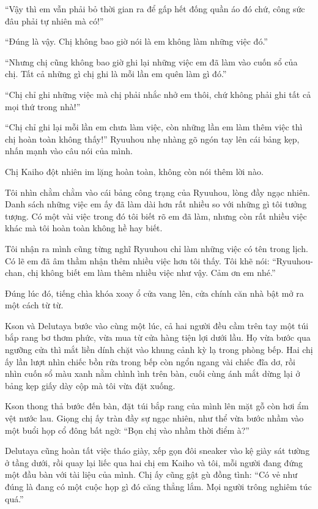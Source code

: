 \documentclass[../main.tex]{subfiles}
\begin{document}
``Vậy thì em vẫn phải bỏ thời gian ra để gấp hết đống quần áo đó chứ, công sức đâu phải tự nhiên mà có!''

``Đúng là vậy. Chị không bao giờ nói là em không làm những việc đó.''

``Nhưng chị cũng không bao giờ ghi lại những việc em đã làm vào cuốn sổ của chị. Tất cả những gì chị ghi là mỗi lần em quên làm gì đó.''

``Chị chỉ ghi những việc mà chị phải nhắc nhở em thôi, chứ không phải ghi tất cả mọi thứ trong nhà!''

``Chị chỉ ghi lại mỗi lần em chưa làm việc, còn những lần em làm thêm việc thì chị hoàn toàn không thấy!'' Ryuuhou nhẹ nhàng gõ ngón tay lên cái bảng kẹp, nhấn mạnh vào câu nói của mình.

Chị Kaiho đột nhiên im lặng hoàn toàn, không còn nói thêm lời nào.

Tôi nhìn chằm chằm vào cái bảng công trạng của Ryuuhou, lòng đầy ngạc nhiên. Danh sách những việc em ấy đã làm dài hơn rất nhiều so với những gì tôi tưởng tượng. Có một vài việc trong đó tôi biết rõ em đã làm, nhưng còn rất nhiều việc khác mà tôi hoàn toàn không hề hay biết.

Tôi nhận ra mình cũng từng nghĩ Ryuuhou chỉ làm những việc có tên trong lịch. Có lẽ em đã âm thầm nhận thêm nhiều việc hơn tôi thấy. Tôi khẽ nói: ``Ryuuhou-chan, chị không biết em làm thêm nhiều việc như vậy. Cảm ơn em nhé.''

\ct

Đúng lúc đó, tiếng chìa khóa xoay ổ cửa vang lên, cửa chính căn nhà bật mở ra một cách từ từ.

Kson và Delutaya bước vào cùng một lúc, cả hai người đều cầm trên tay một túi bắp rang bơ thơm phức, vừa mua từ cửa hàng tiện lợi dưới lầu. Họ vừa bước qua ngưỡng cửa thì mắt liền dính chặt vào khung cảnh kỳ lạ trong phòng bếp. Hai chị ấy lần lượt nhìn chiếc bồn rửa trong bếp còn ngổn ngang vài chiếc đĩa dơ, rồi nhìn cuốn sổ màu xanh nằm chình ình trên bàn, cuối cùng ánh mắt dừng lại ở bảng kẹp giấy dày cộp mà tôi vừa đặt xuống.

Kson thong thả bước đến bàn, đặt túi bắp rang của mình lên mặt gỗ còn hơi ẩm vệt nước lau. Giọng chị ấy tràn đầy sự ngạc nhiên, như thể vừa bước nhầm vào một buổi họp cổ đông bất ngờ: ``Bọn chị vào nhầm thời điểm à?''

Delutaya cũng hoàn tất việc tháo giày, xếp gọn đôi sneaker vào kệ giày sát tường ở tầng dưới, rồi quay lại liếc qua hai chị em Kaiho và tôi, mỗi người đang đứng một đầu bàn với tài liệu của mình. Chị ấy cũng gật gù đồng tình: ``Có vẻ như đúng là đang có một cuộc họp gì đó căng thẳng lắm. Mọi người trông nghiêm túc quá.''
\end{document}
